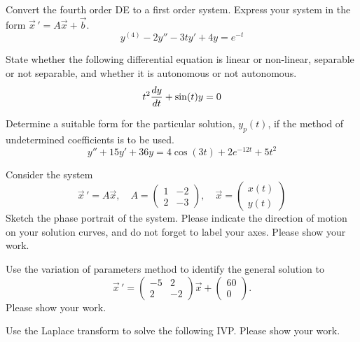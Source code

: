 \documentclass[12pt]{exam}
\begin{document}
    


\newpage


\InitialsRight

\begin{questions}

    \question[2] Convert the fourth order DE to a first order system. Express your system in the form $\vec x \, ' = A\vec x +\vec b$. 
    $$y^{(4)}- 2 y'' -3ty'+4y = e^{-t}$$
    \vspace{6cm}
    
    \question[1] State whether the following differential equation is linear or non-linear, separable or not separable, and whether it is autonomous or not autonomous. 
    $$t^2{\frac{dy}{dt}} + \sin(t) y = 0$$
    \vspace{2cm}

    \question[4] Determine a suitable form for the particular solution, \(y_p(t)\), if the method of undetermined coefficients is to be used. 
    $$y''+ 15y'+36y = 4\cos(3t)+2e^{-12t}+5t^2$$  
    
    
    \newpage \Initials
    \question[3]  Consider the system $$\vec x \, ' = A\vec x, \quad A = \begin{pmatrix} 1&-2\\2&-3 \end{pmatrix}, \quad \vec x = \begin{pmatrix} x(t)\\y(t)\end{pmatrix} $$ Sketch the phase portrait of the system. Please indicate the direction of motion on your solution curves, and do not forget to label your axes. Please show your work.
    \vspace{5cm}
    
    
    
    
    

    \newpage \Initials
    \question[10] Use the variation of parameters method to identify the general solution to \[\vec{x} \, ' = \left( \begin{array}{rr} -5 & 2 \\ 2 & -2 \end{array} \right) \vec{x}  +  \begin{pmatrix} 60\\ 0 \end{pmatrix} . \]
    Please show your work.
    
    
    \newpage \Initials
    \question[10] Use the Laplace transform to solve the following IVP. Please show your work. 


\end{questions}
\end{document}
